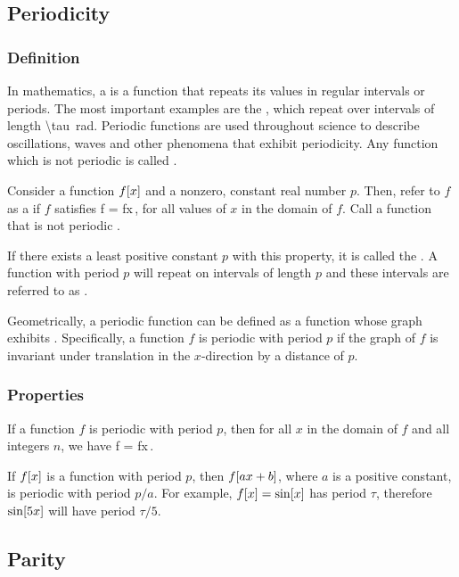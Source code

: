 \subsection{Periodicity}

\subsubsection{Definition}
In mathematics, a  is a function that repeats its values in regular intervals or periods. The most important examples are the , which repeat over intervals of length \SI{\tau}{rad}. Periodic functions are used throughout science to describe oscillations, waves and other phenomena that exhibit periodicity. Any function which is not periodic is called .

\begin{definition}
Consider a function $f\!\left[{x}\right]$ and a nonzero, constant real number $p$. Then, refer to $f$ as a  if $f$ satisfies
\beq
f = f\vat x\,,
\eeq
for all values of $x$ in the domain of $f$. Call a function that is not periodic .
\end{definition}

If there exists a least positive constant $p$ with this property, it is called the . A function with period $p$ will repeat on intervals of length $p$ and these intervals are referred to as .

Geometrically, a periodic function can be defined as a function whose graph exhibits . Specifically, a function $f$ is periodic with period $p$ if the graph of $f$ is invariant under translation in the $x$-direction by a distance of $p$.


\subsubsection{Properties}
If a function $f$ is periodic with period $p$, then for all $x$ in the domain of $f$ and all integers $n$, we have
\beq
f = f\vat x\,.
\eeq

If $f\!\left[{x}\right]$ is a function with period $p$, then $f\!\left[{ax + b}\right]$, where $a$ is a positive constant, is periodic with period $p/a$. For example, $f\!\left[{x}\right] = \sin\!\left[{x}\right]$ has period $\tau$, therefore $\sin\!\left[{5x}\right]$ will have period $\tau/5$.


\subsection{Parity}

